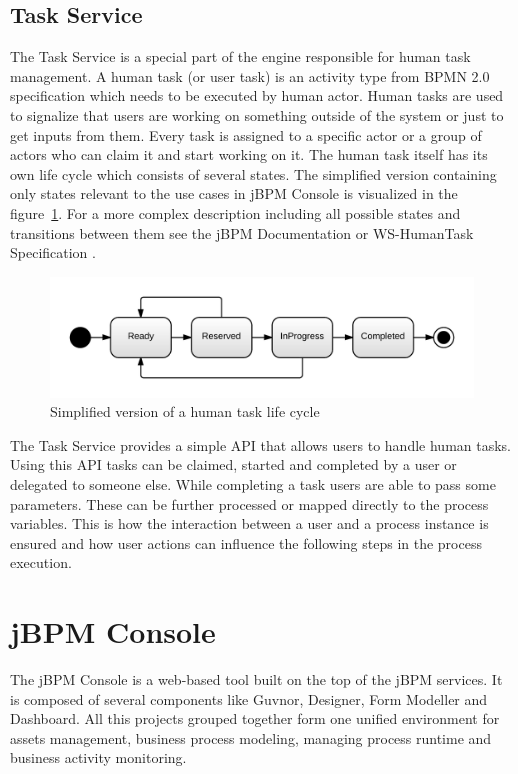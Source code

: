 \documentclass[12pt,oneside,final]{fithesis2}
\begin{document}
\subsection{Task Service}
The Task Service is a special part of the engine responsible for human task management.
A human task (or user task) is an activity type from BPMN 2.0 specification which needs to be executed by human actor.
Human tasks are used to signalize that users are working on something outside of the system or just to get inputs from them.
Every task is assigned to a specific actor or a group of actors who can claim it and start working on it.
The human task itself has its own life cycle which consists of several states.
The simplified version containing only states relevant to the use cases in jBPM Console is visualized in the figure~\ref{fig:task-lifecycle}.
For a more complex description including all possible states and transitions between them see the jBPM Documentation \cite{jbpm6tasklife} or WS-HumanTask Specification \cite{ws-humantask}.

\begin{figure}[ht!]
\centering
\includegraphics[width=\textwidth]{images/task-lifecycle.png}
\caption{Simplified version of a human task life cycle}
\label{fig:task-lifecycle}
\end{figure}

The Task Service provides a simple API that allows users to handle human tasks.
Using this API tasks can be claimed, started and completed by a user or delegated to someone else.
While completing a task users are able to pass some parameters.
These can be further processed or mapped directly to the process variables.
This is how the interaction between a user and a process instance is ensured and how user actions can influence the following steps in the process execution.

\section{jBPM Console}
The jBPM Console is a web-based tool built on the top of the jBPM services.
It is composed of several components like Guvnor, Designer, Form Modeller and Dashboard.
All this projects grouped together form one unified environment for assets management, business process modeling, managing process runtime and business activity monitoring.
\end{document}
